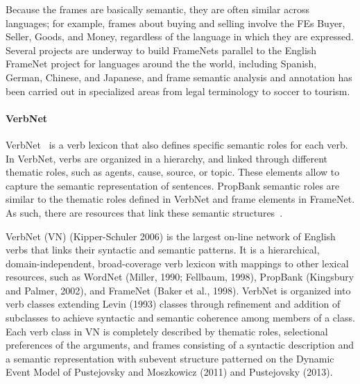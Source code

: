 Because the frames are basically semantic, they are often similar across languages; for example, frames about buying and selling involve the FEs Buyer, Seller, Goods, and Money, regardless of the language in which they are expressed. Several projects are underway to build FrameNets parallel to the English FrameNet project for languages around the the world, including Spanish, German, Chinese, and Japanese, and frame semantic analysis and annotation has been carried out in specialized areas from legal terminology to soccer to tourism.

\paragraph{VerbNet}

  VerbNet~\cite{verbnet} is a verb lexicon that also defines specific semantic roles for each verb. In VerbNet, verbs are organized in a hierarchy, and linked through different thematic roles, such as agents, cause, source, or topic. These elements allow to capture the semantic representation of sentences.
  PropBank semantic roles are similar to the thematic roles defined in VerbNet and frame elements in FrameNet. As such, there are resources that link these semantic structures~\cite{semlink}.

  VerbNet (VN) (Kipper-Schuler 2006) is the largest on-line network of English verbs that links their syntactic and semantic patterns. It is a hierarchical, domain-independent, broad-coverage verb lexicon with mappings to other lexical resources, such as WordNet (Miller, 1990; Fellbaum, 1998), PropBank (Kingsbury and Palmer, 2002), and FrameNet (Baker et al., 1998). VerbNet is organized into verb classes extending Levin (1993) classes through refinement and addition of subclasses to achieve syntactic and semantic coherence among members of a class. Each verb class in VN is completely described by thematic roles, selectional preferences of the arguments, and frames consisting of a syntactic description and a semantic representation with subevent structure patterned on the Dynamic Event Model of Pustejovsky and Moszkowicz (2011) and Pustejovsky (2013).

